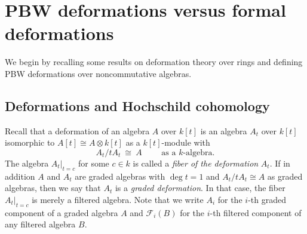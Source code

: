 \documentclass[11pt]{amsart}
\numberwithin{equation}{section}
\newcommand{\BBB}{B}
\newcommand{\sA}{A }
\renewcommand{\_}[1]{\mbox{$_{\left( #1 \right)}$}}
\newcommand{\F}{\mathcal F}
\newcommand{\ot}{\otimes}
\begin{document}




\section{PBW deformations versus formal deformations}
\label{sec:deformations}

We begin by recalling some results on
deformation theory over rings and defining PBW deformations over
noncommutative algebras.

\subsection*{Deformations and Hochschild cohomology}
Recall that a deformation of an algebra $\sA$ over $k[t]$ is 
an algebra $\sA_t$ over $k[t]$
isomorphic to $\sA[t]\cong \sA\ot k[t]$ as a $k[t]$-module
with $$\sA_t/t\sA_t \ \cong\ \sA \qquad\text{ as a $k$-algebra.}
$$
The algebra $\sA_t|_{t=c}$ for some $c\in k$
is called a {\em fiber of the deformation} $\sA_t$.
If in addition $\sA$ and $\sA_t$ are graded algebras with $\deg t=1$
and
$\sA_t/ t\sA_t\cong \sA$ as graded algebras, 
then we say that $\sA_t$ is a {\em graded deformation}.
In that case, the fiber $\sA_t|_{t=c}$ is merely a filtered algebra.
Note that we
write $\sA_i$ for the $i$-th
graded component of a graded algebra $\sA$ 
and $\F_i(\BBB)$ for the $i$-th
filtered component of any filtered algebra $\BBB$.
\end{document}
